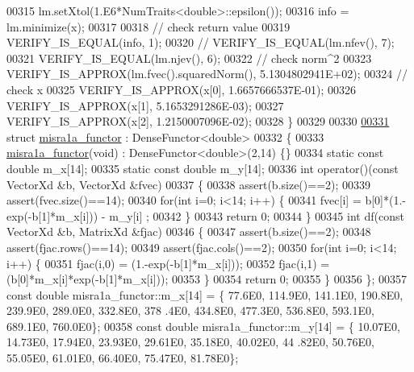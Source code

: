 \begin{DoxyCode}
00315   lm.setXtol(1.E6*NumTraits<double>::epsilon());
00316   info = lm.minimize(x);
00317 
00318   \textcolor{comment}{// check return value}
00319   VERIFY\_IS\_EQUAL(info, 1);
00320 \textcolor{comment}{//   VERIFY\_IS\_EQUAL(lm.nfev(), 7);}
00321   VERIFY\_IS\_EQUAL(lm.njev(), 6);
00322   \textcolor{comment}{// check norm^2}
00323   VERIFY\_IS\_APPROX(lm.fvec().squaredNorm(), 5.1304802941E+02);
00324   \textcolor{comment}{// check x}
00325   VERIFY\_IS\_APPROX(x[0], 1.6657666537E-01);
00326   VERIFY\_IS\_APPROX(x[1], 5.1653291286E-03);
00327   VERIFY\_IS\_APPROX(x[2], 1.2150007096E-02);
00328 \}
00329 
00330 
\hyperlink{structmisra1a__functor}{00331} \textcolor{keyword}{struct }\hyperlink{structmisra1a__functor}{misra1a\_functor} : DenseFunctor<double>
00332 \{
00333     \hyperlink{structmisra1a__functor}{misra1a\_functor}(\textcolor{keywordtype}{void}) : DenseFunctor<double>(2,14) \{\}
00334     \textcolor{keyword}{static} \textcolor{keyword}{const} \textcolor{keywordtype}{double} m\_x[14];
00335     \textcolor{keyword}{static} \textcolor{keyword}{const} \textcolor{keywordtype}{double} m\_y[14];
00336     \textcolor{keywordtype}{int} operator()(\textcolor{keyword}{const} VectorXd &b, VectorXd &fvec)
00337     \{
00338         assert(b.size()==2);
00339         assert(fvec.size()==14);
00340         \textcolor{keywordflow}{for}(\textcolor{keywordtype}{int} i=0; i<14; i++) \{
00341             fvec[i] = b[0]*(1.-exp(-b[1]*m\_x[i])) - m\_y[i] ;
00342         \}
00343         \textcolor{keywordflow}{return} 0;
00344     \}
00345     \textcolor{keywordtype}{int} df(\textcolor{keyword}{const} VectorXd &b, MatrixXd &fjac)
00346     \{
00347         assert(b.size()==2);
00348         assert(fjac.rows()==14);
00349         assert(fjac.cols()==2);
00350         \textcolor{keywordflow}{for}(\textcolor{keywordtype}{int} i=0; i<14; i++) \{
00351             fjac(i,0) = (1.-exp(-b[1]*m\_x[i]));
00352             fjac(i,1) = (b[0]*m\_x[i]*exp(-b[1]*m\_x[i]));
00353         \}
00354         \textcolor{keywordflow}{return} 0;
00355     \}
00356 \};
00357 \textcolor{keyword}{const} \textcolor{keywordtype}{double} misra1a\_functor::m\_x[14] = \{ 77.6E0, 114.9E0, 141.1E0, 190.8E0, 239.9E0, 289.0E0, 332.8E0, 378
      .4E0, 434.8E0, 477.3E0, 536.8E0, 593.1E0, 689.1E0, 760.0E0\};
00358 \textcolor{keyword}{const} \textcolor{keywordtype}{double} misra1a\_functor::m\_y[14] = \{ 10.07E0, 14.73E0, 17.94E0, 23.93E0, 29.61E0, 35.18E0, 40.02E0, 44
      .82E0, 50.76E0, 55.05E0, 61.01E0, 66.40E0, 75.47E0, 81.78E0\};

\end{DoxyCode}
